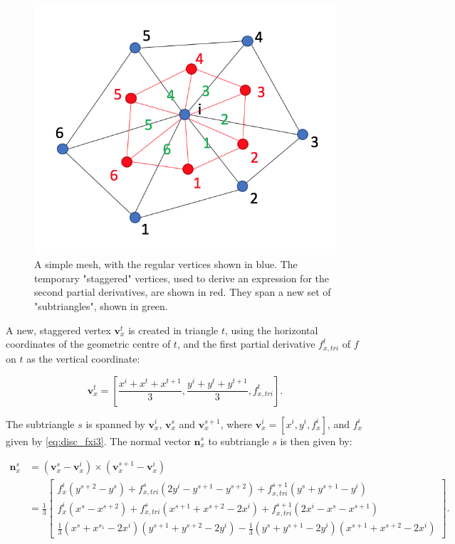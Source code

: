 \documentclass{article}
\begin{document}
\begin{figure}[H] \label{fig:mesh_disc_02}
  \includegraphics[width=0.3\linewidth]{Fig_mesh_disc_02.png}
  \caption{A simple mesh, with the regular vertices shown in blue. The temporary "staggered" vertices, used to derive an expression for the second partial derivatives, are shown in red. They span a new set of "subtriangles", shown in green.}
\end{figure}

A new, staggered vertex $\textbf{v}_x^t$ is created in triangle $t$, using the horizontal coordinates of the geometric centre of $t$, and the first partial derivative $f_{x,tri}^t$ of $f$ on $t$ as the vertical coordinate:

\begin{equation} \label{eq:disc_vxt}
\textbf{v}_x^t = \left[ \frac{x^i + x^t + x^{t+1}}{3}, \frac{y^i + y^t + y^{t+1}}{3}, f_{x,tri}^t \right].
\end{equation}

The subtriangle $s$ is spanned by $\textbf{v}_x^i$, $\textbf{v}_x^s$ and $\textbf{v}_x^{s+1}$, where $\textbf{v}_x^i = \left[ x^i, y^i, f_x^i \right]$, and $f_x^i$ given by \eqref{eq:disc_fxi3}. The normal vector $\textbf{n}_x^s$ to subtriangle $s$ is then given by:

\begin{equation} \label{eq:disc_normvec2}
\begin{split}
\textbf{n}_x^s &= (\textbf{v}_x^s - \textbf{v}_x^i) \times (\textbf{v}_x^{s+1} - \textbf{v}_x^i) \\
 &= \frac{1}{3} \begin{bmatrix}
 f_x^i (y^{s+2} - y^s) + f_{x,tri}^s (2y^i - y^{s+1} - y^{s+2}) + f_{x,tri}^{s+1} (y^s + y^{s+1} - y^i) \\
 f_x^i (x^s - x^{s+2}) + f_{x,tri}^s (x^{s+1} + x^{s+2} - 2x^i) + f_{x,tri}^{s+1} (2x^i - x^s - x^{s+1}) \\
 \frac{1}{3} (x^s +x^{s_1} - 2x^i) (y^{s+1} + y^{s+2} - 2y^i) - \frac{1}{3} (y^s + y^{s+1} - 2y^i) (x^{s+1} +x^{s+2} - 2x^i)
 \end{bmatrix}.
\end{split}
\end{equation}
\end{document}
